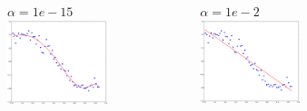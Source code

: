 \documentclass[handout]{beamer}
\begin{document}
\begin{frame}
\begin{columns}
\begin{figure}
\end{figure}
\vspace{-2em}
\begin{figure}
$\alpha=1e-15$
\includegraphics[width=0.99\textwidth]{./fig/L1/lasso_alpha1e-15.png}
\end{figure}
\vspace{-2em}
\begin{figure}
$\alpha=1e-2$
\includegraphics[width=0.99\textwidth]{./fig/L1/lasso_alpha1e-2.png}
\end{figure}

\end{columns}
\end{frame}
\end{document}
